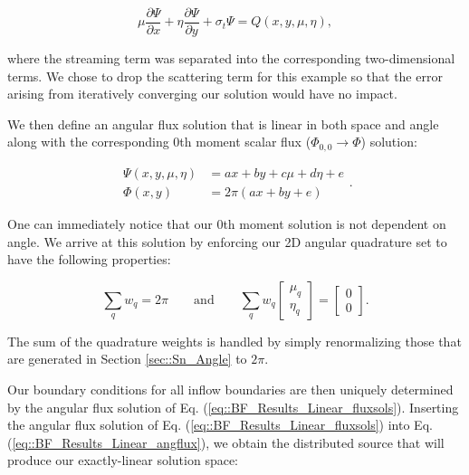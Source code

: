 \begin{equation}
\label{eq::BF_Results_Linear_angflux}
\mu \frac{\partial \Psi}{\partial x} + \eta \frac{\partial \Psi}{\partial y} + \sigma_t \Psi = Q(x,y, \mu, \eta), 
\end{equation}

\noindent where the streaming term was separated into the corresponding two-dimensional terms. We chose to drop the scattering term for this example so that the error arising from iteratively converging our solution would have no impact.

We then define an angular flux solution that is linear in both space and angle along with the corresponding 0th moment scalar flux ($\Phi_{0,0} \rightarrow \Phi$) solution:

\begin{equation}
\label{eq::BF_Results_Linear_fluxsols}
\begin{aligned}
\Psi (x,y,\mu,\eta) &= ax + by + c \mu + d\eta + e\\
\Phi (x,y) &= 2 \pi \left( ax + by  + e \right)
\end{aligned} .
\end{equation}

\noindent One can immediately notice that our 0th moment solution is not dependent on angle. We arrive at this solution by enforcing our 2D angular quadrature set to have the following properties:

\begin{equation}
\label{eq::BF_Results_Linear_quadrules}
\sum_{q} w_q = 2 \pi \qquad \text{and} \qquad \sum_{q} w_q  \left[
	\begin{array}{c}
		\mu_q \\
		\eta_q
	\end{array} \right] = \left[
	\begin{array}{c}
		0 \\
		0
	\end{array} \right] .
\end{equation}

\noindent The sum of the quadrature weights is handled by simply renormalizing those that are generated in Section \ref{sec::Sn_Angle} to $2 \pi$.

Our boundary conditions for all inflow boundaries are then uniquely determined by the angular flux solution of Eq. (\ref{eq::BF_Results_Linear_fluxsols}). Inserting the angular flux solution of Eq. (\ref{eq::BF_Results_Linear_fluxsols}) into Eq. (\ref{eq::BF_Results_Linear_angflux}), we obtain the distributed source that will produce our exactly-linear solution space:

